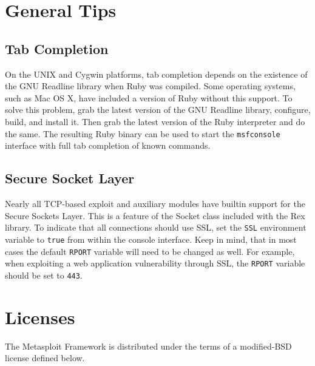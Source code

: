 \documentclass{report}
\begin{document}
\pagebreak

\chapter{General Tips}

	\section{Tab Completion}
	\label{REF-TAB}

\par
On the UNIX and Cygwin platforms, tab completion depends on the existence of the
GNU Readline library when Ruby was compiled. Some operating systems, such as Mac
OS X, have included a version of Ruby without this support. To solve this
problem, grab the latest version of the GNU Readline library, configure, build,
and install it. Then grab the latest version of the Ruby interpreter and do the
same. The resulting Ruby binary can be used to start the \texttt{msfconsole}
interface with full tab completion of known commands.

	\section{Secure Socket Layer}
	\label{REF-SSL}

\par
Nearly all TCP-based exploit and auxiliary modules have builtin support for the
Secure Sockets Layer. This is a feature of the Socket class included with the
Rex library. To indicate that all connections should use SSL, set the
\texttt{SSL} environment variable to \texttt{true} from within the console
interface. Keep in mind, that in most cases the default \texttt{RPORT} variable
will need to be changed as well. For example, when exploiting a web application
vulnerability through SSL, the \texttt{RPORT} variable should be set to
\texttt{443}.

\pagebreak

\chapter{Licenses}

\par
The Metasploit Framework is distributed under the terms of a modified-BSD
license defined below.
\end{document}
